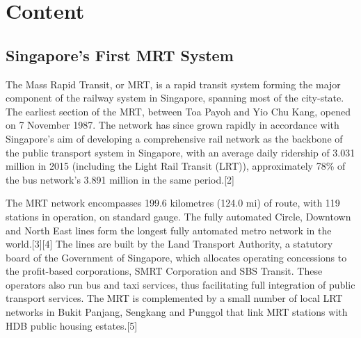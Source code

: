 \documentclass[a4paper,10pt]{article}
\title{}
\author{}
\date{}
\begin{document}

\section{Content}
\doublespacing
\subsection{Singapore's First MRT System}
The Mass Rapid Transit, or MRT, is a rapid transit system forming the major component of the railway system in Singapore, spanning most of the city-state. The earliest section of the MRT, between Toa Payoh and Yio Chu Kang, opened on 7 November 1987. The network has since grown rapidly in accordance with Singapore's aim of developing a comprehensive rail network as the backbone of the public transport system in Singapore, with an average daily ridership of 3.031 million in 2015 (including the Light Rail Transit (LRT)), approximately 78\% of the bus network's 3.891 million in the same period.[2]

The MRT network encompasses 199.6 kilometres (124.0 mi) of route, with 119 stations in operation, on standard gauge. The fully automated Circle, Downtown and North East lines form the longest fully automated metro network in the world.[3][4] The lines are built by the Land Transport Authority, a statutory board of the Government of Singapore, which allocates operating concessions to the profit-based corporations, SMRT Corporation and SBS Transit. These operators also run bus and taxi services, thus facilitating full integration of public transport services. The MRT is complemented by a small number of local LRT networks in Bukit Panjang, Sengkang and Punggol that link MRT stations with HDB public housing estates.[5]
\end{document}

